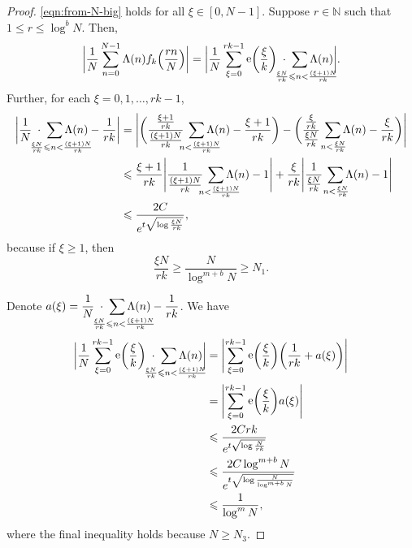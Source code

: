 \documentclass[letterpaper, 12pt]{article}
\theoremstyle{plain}
\theoremstyle{definition}
\theoremstyle{plain}
\theoremstyle{plain}
\numberwithin{equation}{section}
\newcommand{\N}{\mathbb{N}}
\renewcommand{\leq}{\leqslant}
\renewcommand{\geq}{\geqslant}
\newcommand{\1}{\textbf{1}}
\DeclareMathOperator{\e}{e}
\begin{document}
\begin{proof}
    \cref{eqn:from-N-big} holds for all $\xi \in [0, N - 1]$. Suppose \(r \in \N\) such that $1 \leq r \leq \log^b N$. Then,
    \begin{equation}\label{eqn:restricting-xi}
        \biggl\lvert \frac{1}{N} \sum_{n = 0}^{N - 1} \Lambda(n) f_k\Bigl(\frac{rn}{N} \Bigr) \biggr\rvert 
        = \biggl\lvert \frac{1}{N} \sum_{\xi = 0}^{rk - 1} \e\biggl(\frac{\xi}{k} \biggr) \; \cdot \;
        \smashoperator{\sum_{\mkern26mu \frac{\xi N}{rk} \leq n < \frac{(\xi + 1) N}{rk}}}  \Lambda(n) \biggr\rvert.
    \end{equation}
    Further, for each $\xi = 0, 1, \ldots, rk - 1$,
    \begin{align*}
        \biggl\lvert \frac{1}{N} \; \cdot \; \smashoperator{\sum_{\mkern26mu \frac{\xi N}{rk} \leq n < \frac{(\xi + 1)N}{rk}}} \Lambda(n) - \frac{1}{rk} \biggr\rvert
        &= \Biggl\lvert \biggl(\frac{\frac{\xi + 1}{rk}}{\frac{(\xi + 1)N}{rk}} \:\smashoperator{\sum_{\mkern14mu n < \frac{(\xi + 1)N}{{rk}}}} \Lambda(n) - \frac{\xi + 1}{rk} \biggr) 
        - \biggl(\frac{\frac{\xi}{rk}}{\frac{\xi N}{rk}} \:\smashoperator{\sum_{\, n < \frac{\xi N}{rk}}} \Lambda(n) - \frac{\xi}{rk} \biggr)\Biggr\rvert\\
        &\leq \frac{\xi + 1}{rk} \Biggl\lvert \frac{1}{\frac{(\xi + 1)N}{rk}} \:\smashoperator{\sum_{\mkern14mu n < \frac{(\xi + 1)N}{{rk}}}} \Lambda(n) - 1 \Biggr\rvert 
        + \frac{\xi}{rk} \Biggl\lvert \frac{1}{\frac{\xi N}{rk}} \:\smashoperator{\sum_{\, n < \frac{\xi N}{rk}}} \Lambda(n) - 1 \Biggr\rvert\\
        &\leq \frac{2C}{e^{t\sqrt{\log \frac{\xi N}{rk}}}},
    \end{align*}
    because if $\xi \geq 1$, then
    \begin{equation*}
        \frac{\xi N}{rk} \geq \frac{N}{\log^{m + b} N}\geq N_1.
    \end{equation*}
    
    Denote $\displaystyle a(\xi) = \frac{1}{N} \;\cdot\; \smashoperator{\sum_{\mkern26mu \frac{\xi N}{rk} \leq n < \frac{(\xi + 1)N}{rk}}} \Lambda(n) - \frac{1}{rk}$. We have
    \begin{align}
        \biggl\lvert \frac{1}{N} \sum_{\xi = 0}^{rk - 1} \e\biggl(\frac{\xi}{k} \biggr) 
        \;\cdot\;
        \smashoperator{\sum_{\mkern26mu \frac{\xi N}{rk} \leq n < \frac{(\xi + 1)N}{rk}}} \Lambda(n) \biggr\rvert
        &= \Biggl\lvert \sum_{\xi = 0}^{rk - 1} \e\biggl(\frac{\xi}{k} \biggr) \biggl(\frac{1}{rk} + a(\xi) \biggr) \Biggr\rvert \nonumber\\
        &= \Biggl\lvert \sum_{\xi = 0}^{rk - 1} \e\biggl(\frac{\xi}{k} \biggr) a(\xi) \Biggr\rvert \nonumber\\
        &\leq \frac{2Crk}{e^{t\sqrt{\log \frac{N}{rk}}}} \nonumber\\ 
        &\leq \frac{2C\log^{m + b} N}{e^{t \sqrt{\log \frac{N}{\log^{m + b} N}}}} \nonumber\\
        &\leq \frac{1}{\log^m N},\label{eqn:bounding-restricted-xi}
    \end{align}
    where the final inequality holds because $N \geq N_3$.
    

\end{proof}
\end{document}
